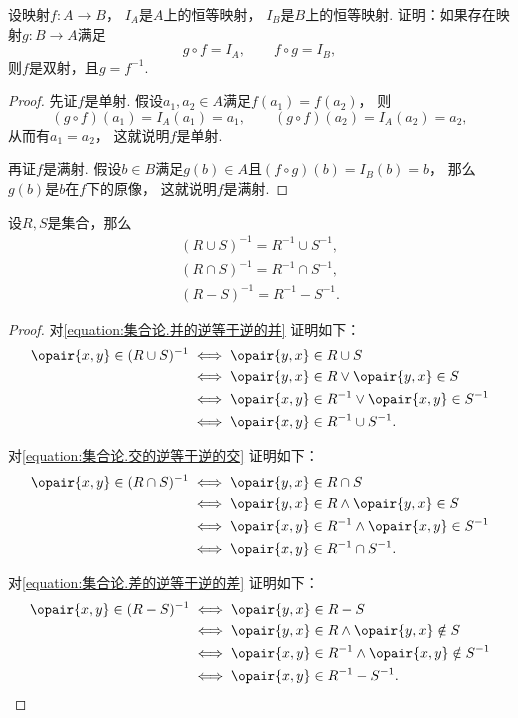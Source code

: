 \begin{example}
设映射\(f\colon A \to B\)，
\(I_A\)是\(A\)上的恒等映射，
\(I_B\)是\(B\)上的恒等映射.
证明：如果存在映射\(g\colon B \to A\)满足\[
	g \circ f = I_A,
	\qquad
	f \circ g = I_B,
\]
则\(f\)是双射，且\(g = f^{-1}\).
\begin{proof}
先证\(f\)是单射.
假设\(a_1,a_2 \in A\)满足\(f(a_1) = f(a_2)\)，
则\[
	(g \circ f)(a_1)
	= I_A(a_1)
	= a_1,
	\qquad
	(g \circ f)(a_2)
	= I_A(a_2)
	= a_2,
\]
从而有\(a_1 = a_2\)，
这就说明\(f\)是单射.

再证\(f\)是满射.
假设\(b \in B\)满足\(g(b) \in A\)且\((f \circ g)(b) = I_B(b) = b\)，
那么\(g(b)\)是\(b\)在\(f\)下的原像，
这就说明\(f\)是满射.
\end{proof}
\end{example}

\begin{theorem}
设\(R,S\)是集合，那么\begin{gather}
	(R \cup S)^{-1} = R^{-1} \cup S^{-1},
	\label{equation:集合论.并的逆等于逆的并} \\
	(R \cap S)^{-1} = R^{-1} \cap S^{-1},
	\label{equation:集合论.交的逆等于逆的交} \\
	(R - S)^{-1} = R^{-1} - S^{-1}.
	\label{equation:集合论.差的逆等于逆的差}
\end{gather}
\begin{proof}
对\cref{equation:集合论.并的逆等于逆的并} 证明如下：
\begin{align*}
	\opair{x,y} \in (R \cup S)^{-1}
	&\iff \opair{y,x} \in R \cup S \\
	&\iff \opair{y,x} \in R \lor \opair{y,x} \in S \\
	&\iff \opair{x,y} \in R^{-1} \lor \opair{x,y} \in S^{-1} \\
	&\iff \opair{x,y} \in R^{-1} \cup S^{-1}.
\end{align*}

对\cref{equation:集合论.交的逆等于逆的交} 证明如下：
\begin{align*}
	\opair{x,y} \in (R \cap S)^{-1}
	&\iff \opair{y,x} \in R \cap S \\
	&\iff \opair{y,x} \in R \land \opair{y,x} \in S \\
	&\iff \opair{x,y} \in R^{-1} \land \opair{x,y} \in S^{-1} \\
	&\iff \opair{x,y} \in R^{-1} \cap S^{-1}.
\end{align*}

对\cref{equation:集合论.差的逆等于逆的差} 证明如下：
\begin{align*}
	\opair{x,y} \in (R - S)^{-1}
	&\iff \opair{y,x} \in R - S \\
	&\iff \opair{y,x} \in R \land \opair{y,x} \notin S \\
	&\iff \opair{x,y} \in R^{-1} \land \opair{x,y} \notin S^{-1} \\
	&\iff \opair{x,y} \in R^{-1} - S^{-1}.
	\qedhere
\end{align*}
\end{proof}
\end{theorem}

